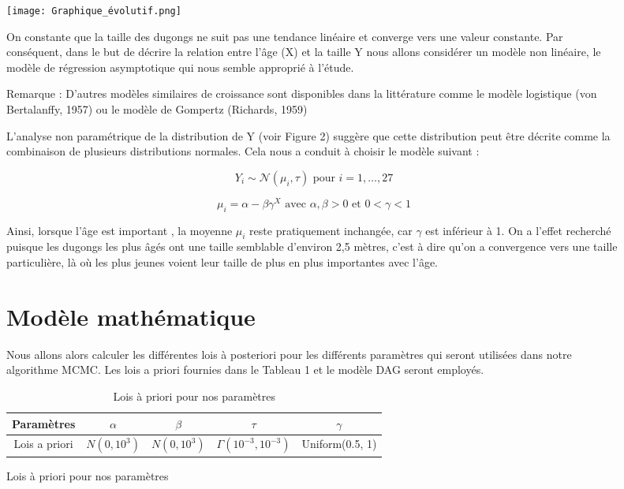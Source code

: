 \documentclass{rapportECN}
\begin{document}
\begin{figure}[H]
\centering
\texttt{[image: Graphique\_évolutif.png]}
\caption{Evolution de la longueur des Dugongs en fonction de leur âge.}

On constante que la taille des dugongs ne suit pas une tendance linéaire et converge vers une valeur constante. Par conséquent, dans le but de décrire la relation entre l'âge (X) et la taille Y nous allons considérer un modèle non linéaire, le modèle de régression asymptotique qui nous semble approprié à l'étude.

Remarque : D'autres modèles similaires de croissance sont disponibles dans la littérature comme le modèle logistique (von Bertalanffy, 1957) ou le modèle de Gompertz (Richards, 1959)

L'analyse non paramétrique de la distribution de Y (voir Figure 2) suggère que cette distribution peut être décrite comme la combinaison de plusieurs distributions normales. Cela nous a conduit à choisir le modèle suivant :

$$Y_i \sim \mathcal{N}(\mu_i, \tau) \text{ pour } i = 1, \dots, 27$$

$$\mu_i = \alpha - \beta \gamma^X \text{ avec } \alpha, \beta > 0 \text{ et } 0 < \gamma < 1$$

Ainsi, lorsque l'âge est important , la moyenne $\mu_i$ reste pratiquement inchangée, car $\gamma$ est inférieur à 1. On a l'effet recherché puisque les dugongs les  plus âgés ont une taille semblable d'environ 2,5 mètres, c'est à dire qu'on a convergence vers une taille particulière, là où les plus jeunes voient leur taille de plus en plus importantes avec l'âge.

\section*{Modèle mathématique}

Nous allons alors calculer les différentes lois à posteriori pour les différents paramètres qui seront utilisées dans notre algorithme MCMC. Les lois a priori fournies dans le Tableau 1 et le modèle DAG seront employés.

\begin{table}[H]
\centering
\begin{tabular}{|c|c|c|c|c|}
\hline
Paramètres & $\alpha$ & $\beta$ & $\tau$ & $\gamma$ \\
\hline
Lois a priori & $N(0, 10^3)$ & $N(0, 10^3)$ & $\Gamma(10^{-3}, 10^{-3})$ & Uniform(0.5, 1) \\
\hline
\end{tabular}
\caption{Lois à priori pour nos paramètres}
\end{table}


\end{figure}
\end{document}
